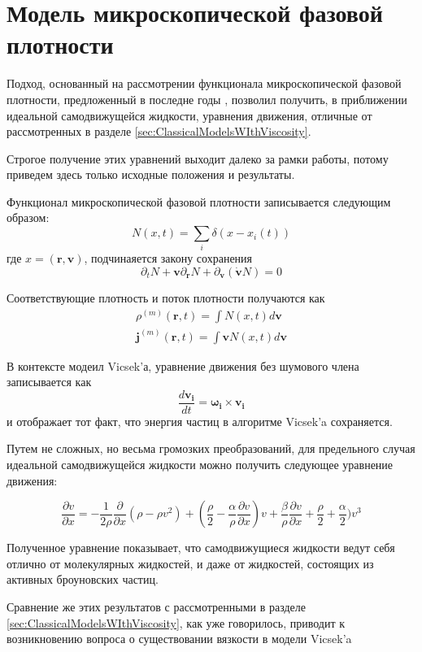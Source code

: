\section{Модель микроскопической фазовой плотности} %
\label{sec:KulinskyModel}

	Подход, основанный на рассмотрении функционала микроскопической фазовой плотности, предложенный в последне годы \cite{chepizhko2013,kulinskii2012}, позволил получить, в приближении идеальной самодвижущейся жидкости, уравнения движения, отличные от рассмотренных в разделе \ref{sec:ClassicalModelsWIthViscosity}.

	Строгое получение этих уравнений выходит далеко за рамки работы, потому приведем здесь только исходные положения и результаты.

	Функционал микроскопической фазовой плотности записывается следующим образом:
	\begin{equation}
		N(x,t) = \sum_i \delta(x-x_i(t))
	\end{equation}
	где $x = (\boldsymbol{r}, \boldsymbol{v})$, подчинаяется закону сохранения
	\begin{equation}
		\partial_t N  + \boldsymbol{v} \partial_{\boldsymbol{r}} N + \partial_{\boldsymbol{v}} (\boldsymbol{\dot{v}} N) = 0
	\end{equation}

	Соответствующие плотность и поток плотности получаются как
	\begin{align}
		\rho^{(m)}(\boldsymbol{r},t) = \int N(x,t)d \boldsymbol{v}
		\\
		\boldsymbol{j}^{(m)}(\boldsymbol{r},t) = \int \boldsymbol{v} N(x,t)d \boldsymbol{v}
	\end{align}

	В контексте модеил Vicsek'а, уравнение движения без шумового члена записывается как
	\begin{equation}
		\frac{d \boldsymbol{v_i}}{dt} = \boldsymbol{\omega_i} \times \boldsymbol{v_i}
	\end{equation}
	и отображает тот факт, что энергия частиц в алгоритме Vicsek'a сохраняется.

	Путем не сложных, но весьма громозких преобразований, для предельного случая идеальной самодвижущейся жидкости можно получить следующее уравнение движения:

	\begin{equation}
	\label{eq:KulinsciiEqOfMotion}
		\frac{\partial v}{\partial x} = -\frac{1}{2 \rho} \frac{\partial}{\partial x} (\rho -\rho v^2)+(\frac{\rho}{2} - \frac{\alpha}{\rho} \frac{\partial v}{\partial x})v + \frac{\beta}{\rho} \frac{\partial v}{\partial x} + \frac{\rho}{2} + \frac{\alpha}{2}) v^3
	\end{equation}

	Полученное уравнение показывает, что самодвижущиеся жидкости ведут себя отлично от молекулярных жидкостей, и даже от жидкостей, состоящих из активных броуновских частиц.

	Сравнение же этих результатов с рассмотренными в разделе \ref{sec:ClassicalModelsWIthViscosity}, как уже говорилось, приводит к возникновению вопроса о существовании вязкости в модели Vicsek'a